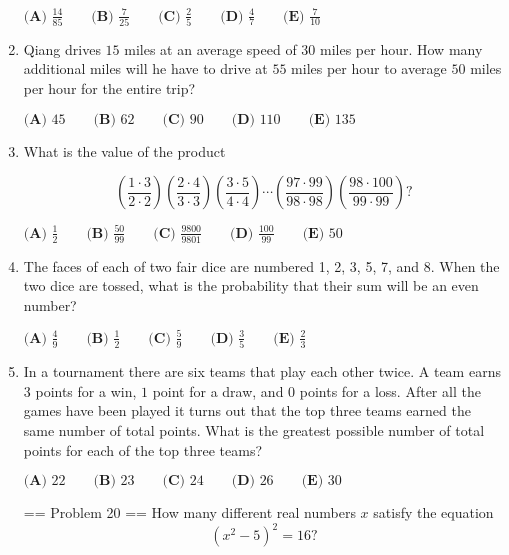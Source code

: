\documentclass{article}
\begin{document}
\begin{enumerate}[label=\arabic*., itemsep=0.5em]
\(\textbf{(A) }\frac{14}{85}\qquad\textbf{(B) }\frac{7}{25}\qquad\textbf{(C) }\frac{2}{5}\qquad\textbf{(D) }\frac{4}{7}\qquad\textbf{(E) }\frac{7}{10}\)\par \vspace{0.5em}\item Qiang drives \(15\) miles at an average speed of \(30\) miles per hour. How many additional miles will he have to drive at \(55\) miles per hour to average \(50\) miles per hour for the entire trip?

\(\textbf{(A) }45\qquad\textbf{(B) }62\qquad\textbf{(C) }90\qquad\textbf{(D) }110\qquad\textbf{(E) }135\)\par \vspace{0.5em}\item What is the value of the product 


\begin{equation*}
\left(\frac{1\cdot3}{2\cdot2}\right)\left(\frac{2\cdot4}{3\cdot3}\right)\left(\frac{3\cdot5}{4\cdot4}\right)\cdots\left(\frac{97\cdot99}{98\cdot98}\right)\left(\frac{98\cdot100}{99\cdot99}\right)?
\end{equation*}


\(\textbf{(A) }\frac{1}{2}\qquad\textbf{(B) }\frac{50}{99}\qquad\textbf{(C) }\frac{9800}{9801}\qquad\textbf{(D) }\frac{100}{99}\qquad\textbf{(E) }50\)\par \vspace{0.5em}\item The faces of each of two fair dice are numbered 1, 2, 3, 5, 7, and 8. When the two dice are tossed, what is the probability that their sum will be an even number?

\(\textbf{(A) }\frac{4}{9}\qquad\textbf{(B) }\frac{1}{2}\qquad\textbf{(C) }\frac{5}{9}\qquad\textbf{(D) }\frac{3}{5}\qquad\textbf{(E) }\frac{2}{3}\)\par \vspace{0.5em}\item In a tournament there are six teams that play each other twice. A team earns \(3\) points for a win, \(1\) point for a draw, and \(0\) points for a loss. After all the games have been played it turns out that the top three teams earned the same number of total points. What is the greatest possible number of total points for each of the top three teams?

\(\textbf{(A) }22\qquad\textbf{(B) }23\qquad\textbf{(C) }24\qquad\textbf{(D) }26\qquad\textbf{(E) }30\)



== Problem 20 == 
How many different real numbers \(x\) satisfy the equation 
\begin{equation*}
(x^{2}-5)^{2}=16?
\end{equation*}



\end{enumerate}
\end{document}
